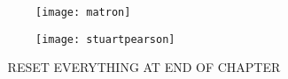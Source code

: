 \def\ps@bigpicture{%
    \setlength\headheight{19cm}%
    \let\@oddfoot\@empty\let\@evenfoot\@empty%
    \def\@evenhead{%
         \begin{picture}(0,0)%
          \put(-149,0){\texttt{[image: stuartpearson]}}%
         \end{picture}%
      }%
    \let\@oddhead\@evenhead%
    \let\@mkboth\@gobbletwo%
    \let\chaptermark\@gobble%
    \let\sectionmark\@gobble%
 }


\def\doubletakeimage{%
  \renewcommand{\topfraction}{.95}
  \begin{figure}[t]
    \thispagestyle{caption}
    \texttt{[image: matron]}%
  \end{figure}

  \begin{figure}[tp]
   \hspace*{-\marginparwidth}\texttt{[image: stuartpearson]}
 \end{figure}
}


\doubletakeimage
\lipsum[1-4]

\restoregeometry
^^A RESET EVERYTHING AT END OF CHAPTER
\addtocounter{chapter}{-2}
\@toctrue\@specialtrue

